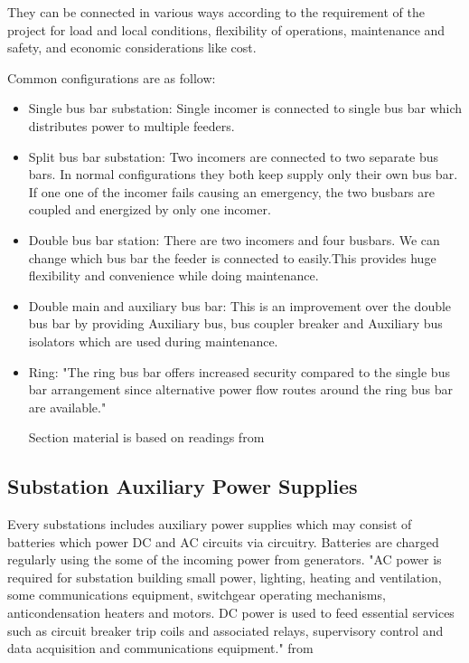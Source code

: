 \documentclass[11pt, a4paper]{article} %
\begin{document}
They can be connected in various ways according to the requirement of the project for load and local conditions, flexibility of operations, maintenance and safety, and economic considerations like cost.

Common configurations are as follow:
\begin{itemize}
    \item Single bus bar substation: Single incomer is connected to single bus bar which distributes power to multiple feeders.
    \item Split bus bar substation: Two incomers are connected to two separate bus bars. In normal configurations they both keep supply only their own bus bar. If one one of the incomer fails causing an emergency, the two busbars are coupled and energized by only one incomer.
    \item Double bus bar station: There are two incomers and four busbars. We can change which bus bar the feeder is connected to easily.This provides huge flexibility and convenience while doing maintenance.
    \item Double main and auxiliary bus bar: This is an improvement over the double bus bar by providing Auxiliary bus, bus coupler breaker and Auxiliary bus isolators which are used during maintenance.
    \item Ring: "The ring bus bar offers increased security compared to the single bus bar arrangement since alternative power flow routes around the ring bus bar are available." 
    
    Section material is based on readings from \citet[Ch.3.3]{book1}
    
\end{itemize}

\subsection{Substation Auxiliary Power Supplies}

Every substations includes auxiliary power supplies which may consist of batteries which power DC and AC circuits via circuitry. Batteries are charged regularly using the some of the incoming power from generators. "AC power is required for substation building small power, lighting, heating and ventilation,
some communications equipment, switchgear operating mechanisms, anticondensation heaters and motors. 
DC power is used to feed essential services such as circuit breaker trip coils and associated relays, supervisory control and data acquisition and communications equipment."
from \citet{book1}
\end{document}
